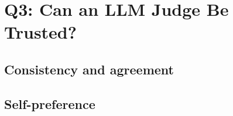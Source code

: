 \chapter{Q3: Can an LLM Judge Be Trusted?}
\label{ch:q3}


\section{Consistency and agreement}



\section{Self-preference}



